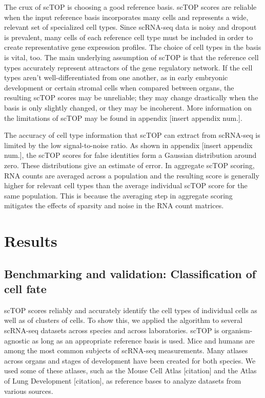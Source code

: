 \documentclass[aps,superscriptaddress, notitlepage,longbibliography]{revtex4-1}
\begin{document}
The crux of scTOP is choosing a good reference basis. scTOP scores are reliable when the input reference basis incorporates many cells and represents a wide, relevant set of specialized cell types. Since scRNA-seq data is noisy and dropout is prevalent, many cells of each reference cell type must be included in order to create representative gene expression profiles. The choice of cell types in the basis is vital, too. The main underlying assumption of scTOP is that the reference cell types accurately represent attractors of the gene regulatory network. If the cell types aren’t well-differentiated from one another, as in early embryonic development or certain stromal cells when compared between organs, the resulting scTOP scores may be unreliable; they may change drastically when the basis is only slightly changed, or they may be incoherent. More information on the limitations of scTOP may be found in appendix [insert appendix num.].

The accuracy of cell type information that scTOP can extract from scRNA-seq is limited by the low signal-to-noise ratio. As shown in appendix [insert appendix num.], the scTOP scores for false identities form a Gaussian distribution around zero. These distributions give an estimate of error. In aggregate scTOP scoring, RNA counts are averaged across a population and the resulting score is generally higher for relevant cell types than the average individual scTOP score for the same population. This is because the averaging step in aggregate scoring mitigates the effects of sparsity and noise in the RNA count matrices.

\section{Results}

\subsection{Benchmarking and validation: Classification of cell fate}
scTOP scores reliably and accurately identify the cell types of individual cells as well as of clusters of cells. To show this, we applied the algorithm to several scRNA-seq datasets across species and across laboratories. scTOP is organism-agnostic as long as an appropriate reference basis is used. Mice and humans are among the most common subjects of scRNA-seq measurements. Many atlases across organs and stages of development have been created for both species. We used some of these atlases, such as the Mouse Cell Atlas [citation] and the Atlas of Lung Development [citation], as reference bases to analyze datasets from various sources.
\end{document}

